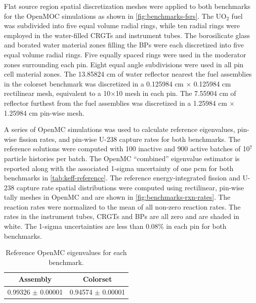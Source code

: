 Flat source region spatial discretization meshes were applied to both benchmarks for the OpenMOC simulations as shown in \autoref{fig:benchmarks-fsrs}. The UO$_2$ fuel was subdivided into five equal volume radial rings, while ten radial rings were employed in the water-filled CRGTs and instrument tubes. The borosilicate glass and borated water material zones filling the BPs were each discretized into five equal volume radial rings. Five equally spaced rings were used in the moderator zones surrounding each pin. Eight equal angle subdivisions were used in all pin cell material zones. The 13.85824 cm of water reflector nearest the fuel assemblies in the colorset benchmark was discretized in a 0.125984 cm $\times$ 0.125984 cm rectilinear mesh, equivalent to a 10$\times$10 mesh in each pin. The 7.55904 cm of reflector furthest from the fuel assemblies was discretized in a 1.25984 cm $\times$ 1.25984 cm pin-wise mesh.

A series of OpenMC simulations was used to calculate reference eigenvalues, pin-wise fission rates, and pin-wise U-238 capture rates for both benchmarks. The reference solutions were computed with 100 inactive and 900 active batches of 10$^7$ particle histories per batch. The OpenMC ``combined'' eigenvalue estimator is reported along with the associated 1-sigma uncertainty of one pcm for both benchmarks in \autoref{tab:keff-reference}. The reference energy-integrated fission and U-238 capture rate spatial distributions were computed using rectilinear, pin-wise tally meshes in OpenMC and are shown in \autoref{fig:benchmarks-rxn-rates}. The reaction rates were normalized to the mean of all non-zero reaction rates. The rates in the instrument tubes, CRGTs and BPs are all zero and are shaded in white. The 1-sigma uncertainties are less than 0.08\% in each pin for both benchmarks.

\begin{table}[h!]
  \centering
  \caption{Reference OpenMC eigenvalues for each benchmark.}
  \label{tab:keff-reference} 
  \begin{tabular}{c c}
  \toprule
  {\bf Assembly} &
  {\bf Colorset} \\
  \midrule
  0.99326 $\pm$ 0.00001 & 0.94574 $\pm$ 0.00001 \\
  \bottomrule
\end{tabular}
\end{table}

